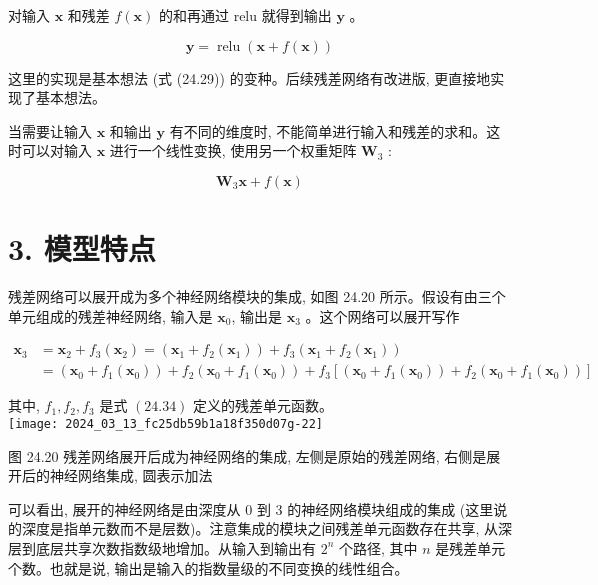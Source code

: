 \documentclass[10pt]{article}
\begin{document}
对输入 $\boldsymbol{x}$ 和残差 $f(\boldsymbol{x})$ 的和再通过 relu 就得到输出 $\boldsymbol{y}$ 。


\begin{equation*}
\boldsymbol{y}=\operatorname{relu}(\boldsymbol{x}+f(\boldsymbol{x})) \tag{24.35}
\end{equation*}


这里的实现是基本想法 (式 (24.29)) 的变种。后续残差网络有改进版, 更直接地实现了基本想法。

当需要让输入 $\boldsymbol{x}$ 和输出 $\boldsymbol{y}$ 有不同的维度时, 不能简单进行输入和残差的求和。这时可以对输入 $\boldsymbol{x}$ 进行一个线性变换, 使用另一个权重矩阵 $\boldsymbol{W}_{3}$ :

$$
\boldsymbol{W}_{3} \boldsymbol{x}+f(\boldsymbol{x})
$$

\section*{3. 模型特点}
残差网络可以展开成为多个神经网络模块的集成, 如图 24.20 所示。假设有由三个单元组成的残差神经网络, 输入是 $\boldsymbol{x}_{0}$, 输出是 $\boldsymbol{x}_{3}$ 。这个网络可以展开写作

$$
\begin{aligned}
\boldsymbol{x}_{3} & =\boldsymbol{x}_{2}+f_{3}\left(\boldsymbol{x}_{2}\right)=\left(\boldsymbol{x}_{1}+f_{2}\left(\boldsymbol{x}_{1}\right)\right)+f_{3}\left(\boldsymbol{x}_{1}+f_{2}\left(\boldsymbol{x}_{1}\right)\right) \\
& =\left(\boldsymbol{x}_{0}+f_{1}\left(\boldsymbol{x}_{0}\right)\right)+f_{2}\left(\boldsymbol{x}_{0}+f_{1}\left(\boldsymbol{x}_{0}\right)\right)+f_{3}\left[\left(\boldsymbol{x}_{0}+f_{1}\left(\boldsymbol{x}_{0}\right)\right)+f_{2}\left(\boldsymbol{x}_{0}+f_{1}\left(\boldsymbol{x}_{0}\right)\right)\right]
\end{aligned}
$$

其中, $f_{1}, f_{2}, f_{3}$ 是式 $(24.34)$ 定义的残差单元函数。\\
\texttt{[image: 2024\_03\_13\_fc25db59b1a18f350d07g-22]}

图 24.20 残差网络展开后成为神经网络的集成, 左侧是原始的残差网络, 右侧是展开后的神经网络集成, 圆表示加法

可以看出, 展开的神经网络是由深度从 0 到 3 的神经网络模块组成的集成 (这里说的深度是指单元数而不是层数)。注意集成的模块之间残差单元函数存在共享, 从深层到底层共享次数指数级地增加。从输入到输出有 $2^{n}$ 个路径, 其中 $n$ 是残差单元个数。也就是说, 输出是输入的指数量级的不同变换的线性组合。
\end{document}
